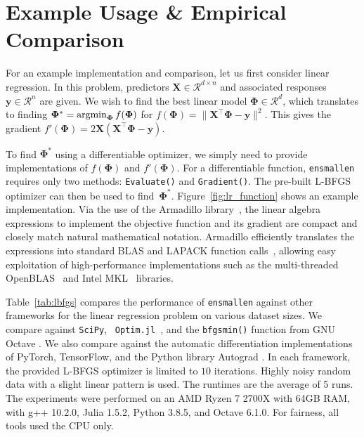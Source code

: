 \documentclass[twoside,11pt]{article}
\begin{document}
\section{Example Usage \& Empirical Comparison}

For an example implementation and comparison, let us first consider linear regression.
In this problem, predictors $\bm X \in \mathcal{R}^{d \times n}$
and associated responses $\bm y \in \mathcal{R}^n$ are given.
We wish to find the best linear model $\bm \Phi \in \mathcal{R}^d$,
which translates to finding
$\bm \Phi^* = \operatornamewithlimits{argmin}_{\bm\Phi} f(\bm \Phi)$ for
$f(\bm \Phi) = \| \bm X^{\top} \bm \Phi - \bm y \|^2.$
This gives the gradient
$f'(\bm \Phi) = 2 \bm X (\bm X^{\top} \bm \Phi - \bm y).$

To find $\bm \Phi^*$ using a differentiable optimizer,
we simply need to provide implementations of $f(\bm \Phi)$ and $f'(\bm \Phi)$.
For a differentiable function, {\tt ensmallen} requires only two methods:
{\tt Evaluate()} and {\tt Gradient()}.
The pre-built L-BFGS optimizer can then be used to find~$\bm \Phi^*$.
Figure~\ref{fig:lr_function} shows an example implementation.
Via the use of the Armadillo library~\citep{sanderson2016armadillo},
the linear algebra expressions to implement the objective function and its gradient
are compact and closely match natural mathematical notation.
Armadillo efficiently translates the expressions into standard BLAS and LAPACK function calls~\citep{anderson1999lapack},
allowing easy exploitation of high-performance implementations such as the multi-threaded \mbox{OpenBLAS}~\citep{OpenBLAS} and Intel MKL~\citep{IntelMKL} libraries.

Table~\ref{tab:lbfgs} compares the performance
of {\tt ensmallen} against other frameworks
for the linear regression problem on various dataset sizes.
We compare against {\tt SciPy}, {\tt
Optim.jl}~\citep{mogensen2018optim}, and the {\tt bfgsmin()} function from GNU
Octave \citep{octave}.
We also compare against the automatic differentiation implementations of
PyTorch, TensorFlow,
and the Python library Autograd \citep{maclaurin2015autograd}.
In each framework, the provided L-BFGS optimizer is limited to $10$ iterations.
Highly noisy random data with a slight linear pattern is used.
The runtimes are the average of 5 runs.
The experiments were performed on an AMD Ryzen 7 2700X with 64GB RAM,
with g++ 10.2.0, Julia 1.5.2, Python 3.8.5, and Octave 6.1.0.
For fairness, all tools used the CPU only.
\end{document}
